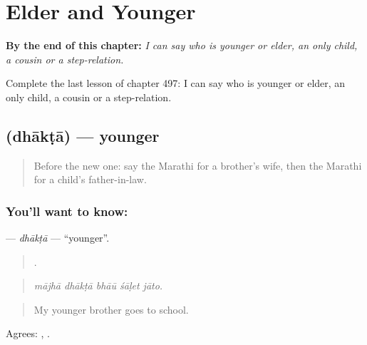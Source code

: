 
\chapter{Elder and Younger}
\label{ch:mr-elder-and-younger}

\begin{chapteropening}
\textbf{By the end of this chapter:} \emph{I can say who is younger or elder, an only child, a cousin or a step-relation.}

Complete the last lesson of chapter 497: I can say who is younger or elder, an only child, a cousin or a step-relation.
\end{chapteropening}

\section[\texorpdfstring{\mr{धाकटा} (dhākṭā)}{धाकटा (dhākṭā)}]{ (dhākṭā) — younger}

\label{lesson:MR-C497-dhakta}



\begin{quote}
Before the new one: say the Marathi for a brother's wife, then the Marathi for a child's father-in-law.
\end{quote}

\subsection*{You'll want to know: }
\textbf{} — \emph{dhākṭā} — \textquotedblleft{}younger\textquotedblright{}.

\begin{quote}
    .
\end{quote}

\begin{quote}
\emph{mājhā dhākṭā bhāū śāḷet jāto.}
\end{quote}

\begin{quote}
My younger brother goes to school.
\end{quote}

Agrees:  ,  .

